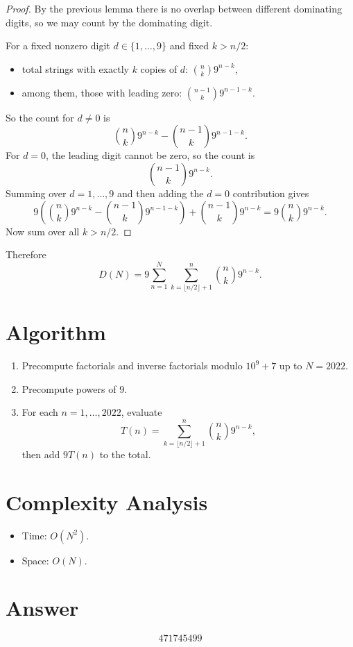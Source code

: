 \documentclass[11pt]{article}
\begin{document}
\begin{proof}
By the previous lemma there is no overlap between different dominating digits, so we may count by the dominating digit.

For a fixed nonzero digit $d \in \{1,\dots,9\}$ and fixed $k>n/2$:
\begin{itemize}
  \item total strings with exactly $k$ copies of $d$: $\binom{n}{k}9^{n-k}$,
  \item among them, those with leading zero: $\binom{n-1}{k}9^{n-1-k}$.
\end{itemize}
So the count for $d \neq 0$ is
\[
  \binom{n}{k}9^{n-k} - \binom{n-1}{k}9^{n-1-k}.
\]
For $d=0$, the leading digit cannot be zero, so the count is
\[
  \binom{n-1}{k}9^{n-k}.
\]
Summing over $d=1,\dots,9$ and then adding the $d=0$ contribution gives
\[
  9\left(\binom{n}{k}9^{n-k} - \binom{n-1}{k}9^{n-1-k}\right)
  + \binom{n-1}{k}9^{n-k}
  = 9\binom{n}{k}9^{n-k}.
\]
Now sum over all $k>n/2$.
\end{proof}

Therefore
\[
  D(N) = 9 \sum_{n=1}^{N} \sum_{k=\lfloor n/2 \rfloor + 1}^{n} \binom{n}{k} 9^{n-k}.
\]

\section{Algorithm}

\begin{enumerate}
  \item Precompute factorials and inverse factorials modulo $10^9+7$ up to $N=2022$.
  \item Precompute powers of $9$.
  \item For each $n=1,\dots,2022$, evaluate
  \[
    T(n) = \sum_{k=\lfloor n/2 \rfloor + 1}^{n} \binom{n}{k} 9^{n-k},
  \]
  then add $9T(n)$ to the total.
\end{enumerate}

\section{Complexity Analysis}

\begin{itemize}
  \item Time: $O(N^2)$.
  \item Space: $O(N)$.
\end{itemize}

\section{Answer}

\[
\boxed{471745499}
\]
\end{document}
